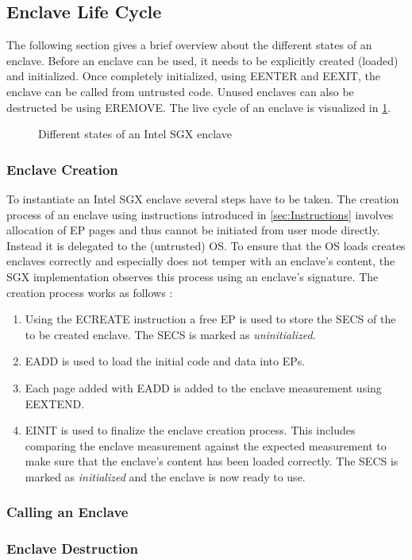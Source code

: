 \subsection{Enclave Life Cycle}
The following section gives a brief overview about the different states of an enclave. Before an enclave can be used, it needs to be explicitly created (loaded) and initialized.
Once completely initialized, using EENTER and EEXIT, the enclave can be called from untrusted code. Unused enclaves can also be destructed be using EREMOVE. The live cycle of an
enclave is visualized in \cref{fig:enclaveLifeCycle}.

\begin{figure}[h]
    \centering
    \caption{Different states of an Intel SGX enclave \cite{Costan2016IntelSE}}
    \label{fig:enclaveLifeCycle}
\end{figure}

\subsubsection{Enclave Creation}
To instantiate an Intel SGX enclave several steps have to be taken. The creation process of an enclave using instructions introduced in \cref{sec:Instructions} involves allocation
of EP pages and thus cannot be initiated from user mode directly. Instead it is delegated to the (untrusted) OS. To ensure that the OS loads creates enclaves correctly and
especially does not temper with an enclave's content, the SGX implementation observes this process using an enclave's signature. The creation process works as follows
\cite{Costan2016IntelSE}:
\begin{enumerate}
    \item Using the ECREATE instruction a free EP is used to store the SECS of the to be created enclave. The SECS is marked as \textit{uninitialized}.
    \item EADD is used to load the initial code and data into EPs.
    \item Each page added with EADD is added to the enclave measurement using EEXTEND.
    \item EINIT is used to finalize the enclave creation process. This includes comparing the enclave measurement against the expected measurement to make sure that the enclave's
          content has been loaded correctly. The SECS is marked as \textit{initialized} and the enclave is now ready to use.
\end{enumerate}

\subsubsection{Calling an Enclave}

\subsubsection{Enclave Destruction}